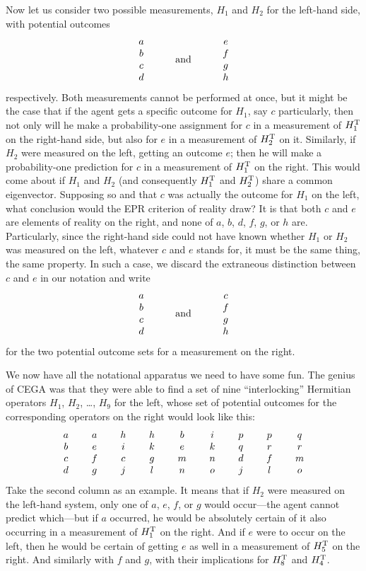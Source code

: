 Now let us consider two possible measurements, $H_1$ and $H_2$ for the left-hand side, with potential outcomes
\begin{equation}
\veec abcd \quad\qquad\mbox{and}\qquad\quad \veec efgh
\end{equation}
respectively.  Both measurements cannot be performed at once, but it might be the case that if the agent gets a specific outcome for $H_1$, say $c$ particularly, then not only will he make a probability-one assignment for $c$ in a measurement of $H_1^{\rm\small T}$ on the right-hand side, but also for $e$ in a measurement of $H_2^{\rm\small T}$ on it.  Similarly, if $H_2$ were measured on the left, getting an outcome $e$; then he will make a probability-one prediction for $c$ in a measurement of $H_1^{\rm\small T}$ on the right.  This would come about if $H_1$ and $H_2$ (and consequently $H_1^{\rm\small T}$ and $H_2^{\rm\small T}$) share a common eigenvector.  Supposing so and that $c$ was actually the outcome for $H_1$ on the left, what conclusion would the EPR criterion of reality draw?  It is that both $c$ and $e$ are elements of reality on the right, and none of $a$, $b$, $d$, $f$, $g$, or $h$ are.  Particularly, since the right-hand side could not have known whether $H_1$ or $H_2$ was measured on the left, whatever $c$ and $e$ stands for, it must be the same thing, the same property.  In such a case, we discard the extraneous distinction between $c$ and $e$ in our notation and write
\begin{equation}
\veec abcd \quad\qquad\mbox{and}\qquad\quad \veec cfgh
\end{equation}
for the two potential outcome sets for a measurement on the right.

We now have all the notational apparatus we need to have some fun.  The genius of CEGA was that they were able to find a set of nine ``interlocking'' Hermitian operators $H_1$, $H_2$, \ldots, $H_9$ for the left, whose set of potential outcomes for the corresponding operators on the right would look like this:
\begin{equation}
\veec abcd \qquad \veec aefg \qquad \veec hicj\qquad \veec hkgl\qquad \veec bemn\qquad \veec ikno\qquad \veec pqdj\qquad \veec prfl\qquad \veec qrmo \label{BurlIves}
\end{equation}
Take the second column as an example.  It means that if $H_2$ were measured on the left-hand system, only one of $a$, $e$, $f$, or $g$ would occur---the agent cannot predict which---but if $a$ occurred, he would be absolutely certain of it also occurring in a measurement of $H_1^{\rm\small T}$ on the right.  And if $e$ were to occur on the left, then he would be certain of getting $e$ as well in a measurement of $H_5^{\rm\small T}$ on the right.  And similarly with $f$ and $g$, with their implications for $H_8^{\rm\small T}$ and $H_4^{\rm\small T}$.

